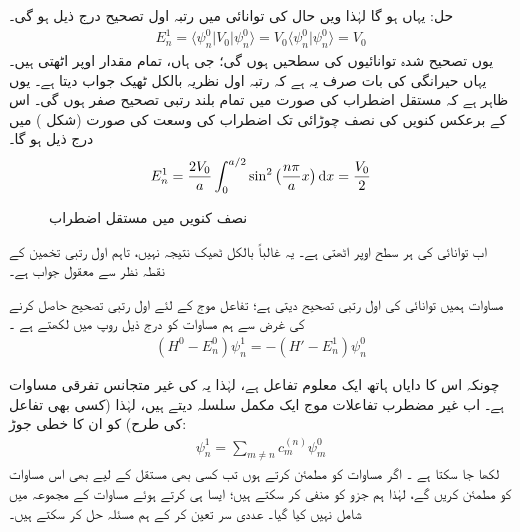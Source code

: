 حل: یہاں    ہو گا لہٰذا    ویں حال کی توانائی میں رتبہ اول تصحیح درج ذیل ہو گی۔
\begin{align*}
E_n^1 = \langle \psi_n^0 | V_0 | \psi_n^0 \rangle = V_0 \langle \psi_n^0 | \psi_n^0 \rangle = V_0
\end{align*}
یوں  تصحیح  شدہ توانائیوں کی سطحیں   ہوں گی؛ جی ہاں،  تمام   مقدار  اوپر  اٹھتی ہیں۔ یہاں حیرانگی کی بات صرف  یہ ہے کہ رتبہ اول نظریہ بالکل ٹھیک جواب دیتا ہے۔ یوں ظاہر ہے کہ مستقل اضطراب کی صورت میں تمام بلند رتبی تصحیح صفر ہوں گی۔  اس کے برعکس کنویں کی نصف چوڑائی تک اضطراب کی وسعت کی صورت  (شکل )  میں درج ذیل   ہو گا۔
\begin{align*}
E_n^1 = \frac{2V_0}{a} \int_0^{a/2} \sin^2 \big(\frac{n \pi}{a} x\big ) \dif  x= \frac{V_0}{2}
\end{align*}
%
\begin{figure}
\centering
{}
\caption{نصف  کنویں میں مستقل اضطراب}
\label{شکل_غیر_تابع_اضطراب_نصف_چکور_مستقل_اضطراب}
\end{figure}


اب توانائی کی ہر سطح  
اوپر  اٹھتی ہے۔ یہ غالباً بالکل ٹھیک نتیجہ نہیں،  تاہم  اول رتبی تخمین کے نقطہ نظر سے معقول جواب ہے۔

 مساوات    ہمیں توانائی کی اول رتبی  تصحیح دیتی ہے؛  تفاعل موج کے لئے اول رتبی تصحیح حاصل کرنے کی غرض سے ہم مساوات    کو درج ذیل روپ میں لکھتے ہے ۔
\begin{align}\label{مساوات_غیر_اضطراب_تصحیح_اول_توانائی}
(H^0 - E_n^0) \psi_n^1 = - (H' - E_n^1) \psi_n^0
\end{align}

چونکہ اس کا دایاں ہاتھ ایک معلوم تفاعل ہے،  لہٰذا یہ  کی  غیر  متجانس  تفرقی مساوات ہے۔  اب غیر مضطرب تفاعلات موج ایک مکمل سلسلہ دیتے ہیں،   لہٰذا   (کسی بھی تفاعل کی طرح)   کو ان کا خطی جوڑ:
\begin{align}\label{مساوات_غیر_اضطراب_تصحیح_اول_تفاعل}
\psi_n^1 = \sum_{m \ne n} c_m^{(n)} \psi_m^0
\end{align}
 لکھا جا سکتا ہے ۔ اگر  مساوات  کو مطمئن کرتے  ہوں تب کسی بھی مستقل  کے لیے  بھی اس مساوات کو مطمئن کریں  گے،   لہٰذا  ہم جزو  کو منفی کر سکتے ہیں؛ ایسا ہی کرتے ہوئے مساوات    کے مجموعہ میں  شامل نہیں کیا گیا۔ عددی سر  تعین کر کے ہم مسئلہ حل کر سکتے ہیں۔
 
